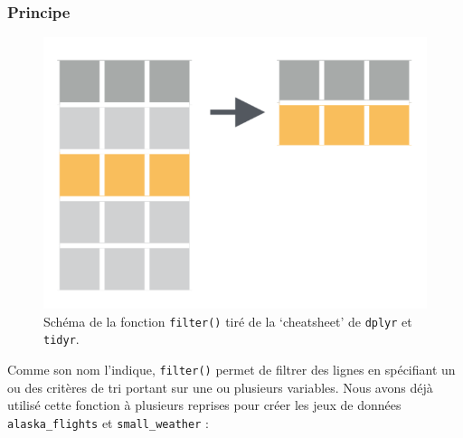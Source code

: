 \documentclass[
  a4paper,
]{article}
\newenvironment{Shaded}{\begin{snugshade}}{\end{snugshade}}
\newcommand{\DecValTok}[1]{\textcolor[rgb]{0.69,0.50,0.00}{#1}}
\newcommand{\KeywordTok}[1]{\textcolor[rgb]{0.12,0.11,0.11}{\textbf{#1}}}
\newcommand{\NormalTok}[1]{\textcolor[rgb]{0.12,0.11,0.11}{#1}}
\newcommand{\OperatorTok}[1]{\textcolor[rgb]{0.12,0.11,0.11}{#1}}
\newcommand{\StringTok}[1]{\textcolor[rgb]{0.75,0.01,0.01}{#1}}
\begin{document}
\hypertarget{principe}{%
\subsubsection{Principe}\label{principe}}

\begin{figure}[htpb]

{\centering \includegraphics[width=0.5\linewidth]{images/filter} 

}

\caption{Schéma de la fonction \texttt{filter()} tiré de la `cheatsheet' de \texttt{dplyr} et \texttt{tidyr}.}\label{fig:filterfig}
\end{figure}



Comme son nom l'indique, \texttt{filter()} permet de filtrer des lignes en spécifiant un ou des critères de tri portant sur une ou plusieurs variables. Nous avons déjà utilisé cette fonction à plusieurs reprises pour créer les jeux de données \texttt{alaska\_flights} et \texttt{small\_weather} :

\begin{Shaded}
\end{Shaded}

\begin{Shaded}
\end{Shaded}
\end{document}
